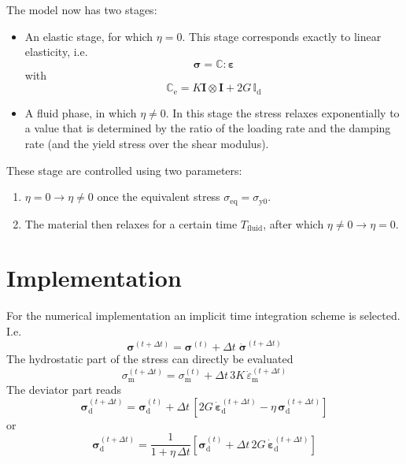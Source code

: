 \documentclass[times,namecite]{goose-article}
\begin{document}
The model now has two stages:
\begin{itemize}
  \item An elastic stage, for which $\eta = 0$. This stage corresponds exactly to linear elasticity, i.e.
  \begin{equation}
    \bm{\sigma} = \mathbb{C} : \bm{\varepsilon}
  \end{equation}
  with
  \begin{equation}
    \mathbb{C}_\mathrm{e} = K \bm{I} \otimes \bm{I} + 2 G \, \mathbb{I}_\mathrm{d}
  \end{equation}
  \item A fluid phase, in which $\eta \neq 0$. In this stage the stress relaxes exponentially to a value that is determined by the ratio of the loading rate and the damping rate (and the yield stress over the shear modulus).
\end{itemize}
These stage are controlled using two parameters:
\begin{enumerate}
  \item $\eta = 0 \rightarrow \eta \neq 0$ once the equivalent stress $\sigma_\mathrm{eq} = \sigma_\mathrm{y0}$.
  \item The material then relaxes for a certain time $T_\mathrm{fluid}$, after which $\eta \neq 0 \rightarrow \eta = 0$.
\end{enumerate}

\section{Implementation}

For the numerical implementation an implicit time integration scheme is selected. I.e.
\begin{equation}
  \bm{\sigma}^{(t+\Delta t)} = \bm{\sigma}^{(t)} + \Delta t \; \dot{\bm{\sigma}}^{(t+\Delta t)}
\end{equation}
The hydrostatic part of the stress can directly be evaluated
\begin{equation}
  \sigma_\mathrm{m}^{(t+\Delta t)} = \sigma_\mathrm{m}^{(t)} + \Delta t \, 3 K \, \dot{\varepsilon}_\mathrm{m}^{(t + \Delta t)}
\end{equation}
The deviator part reads
\begin{equation}
  \bm{\sigma}_\mathrm{d}^{(t+\Delta t)} = \bm{\sigma}_\mathrm{d}^{(t)} + \Delta t \, \left[ 2 G \, \dot{\bm{\varepsilon}}_\mathrm{d}^{(t+\Delta t)} - \eta \, \bm{\sigma}_\mathrm{d}^{(t+\Delta t)} \right]
\end{equation}
or
\begin{equation}
  \bm{\sigma}_\mathrm{d}^{(t+\Delta t)} = \frac{1}{1 + \eta \, \Delta t} \left[ \bm{\sigma}_\mathrm{d}^{(t)} + \Delta t \, 2 G \, \dot{\bm{\varepsilon}}_\mathrm{d}^{(t+\Delta t)} \right]
\end{equation}
\end{document}
